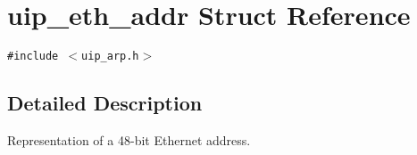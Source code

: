 \hypertarget{a00029}{
\section{uip\_\-eth\_\-addr Struct Reference}
\label{a00029}
}
{\tt \#include $<$uip\_\-arp.h$>$}



\subsection{Detailed Description}
Representation of a 48-bit Ethernet address. 

